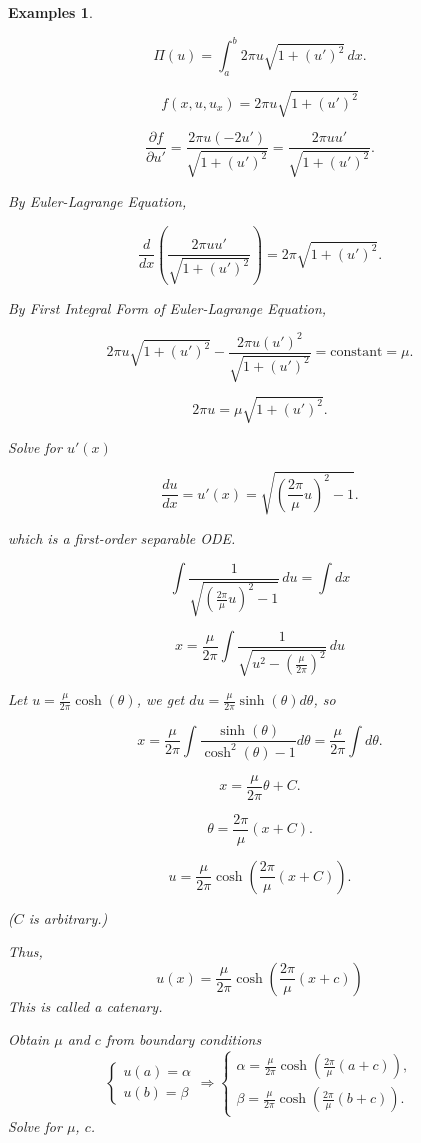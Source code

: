 \documentclass[12pt]{report}
\newtheorem{examples}{Examples}[section]
\begin{document}
\begin{examples}
\begin{enumerate}
\[
\Pi (u) = \int_a^b 2\pi u \sqrt{1+ (u')^2} \,dx.
\]

\[
f(x, u, u_x) = 2\pi u \sqrt{1+ (u')^2}
\]

\[
\frac{\partial f}{\partial  u'} = \frac{2\pi u (-2 u')}{\sqrt{1+(u')^2}} = \frac{2\pi u u'}{\sqrt{1+ (u')^2}}.
\]

By Euler-Lagrange Equation, 

\[
\frac{d}{dx} \left( \frac{2\pi u u'}{\sqrt{1+(u')^2}} \right) = 2\pi \sqrt{1+(u')^2}.
\]

By First Integral Form of Euler-Lagrange Equation, 

\[
2\pi u \sqrt{1+(u')^2} -\frac{ 2\pi u (u')^2}{\sqrt{1+(u')^2}} = \text{constant} = \mu.
\]

\[
2\pi u  = \mu \sqrt{1+(u')^2}.
\]

Solve for \( u'(x) \)

\[
\frac{du}{dx} = u'(x) = \sqrt{\left(\frac{2\pi}{\mu} u\right)^2 - 1}.
\]

which is a first-order separable ODE. 

\[
\int \frac{1}{\sqrt{\left(\frac{2\pi}{\mu} u\right)^2 - 1}} \,du = \int dx
\]

\[
x = \frac{\mu}{2\pi} \int \frac{1}{\sqrt{u^2 - \left(\frac{\mu}{2\pi}\right)^2}} \,du
\]

Let \( u = \frac{\mu}{2\pi} \cosh(\theta) \), we get \(
du = \frac{\mu}{2\pi} \sinh(\theta) d\theta
\), so 

\[
x = \frac{\mu}{2\pi} \int \frac{\sinh(\theta)}{\cosh^2(\theta) - 1} d\theta = \frac{\mu}{2\pi} \int d\theta.
\]

\[
x = \frac{\mu}{2\pi} \theta + C.
\]

\[
\theta = \frac{2\pi}{\mu} (x+C).
\]

\[
u = \frac{\mu}{2\pi} \cosh \left(\frac{2\pi}{\mu} (x+C)\right).
\]

(\( C \) is arbitrary.)

Thus,
\[ u(x) = \frac{\mu}{2\pi} \cosh\left(\frac{2\pi}{\mu} (x + c)\right) \]
This is called a catenary.

Obtain \( \mu \) and \( c \) from boundary conditions
\[
\begin{cases}
    u(a) = \alpha \\
    u(b) = \beta
\end{cases}
\Rightarrow
\begin{cases}
    \alpha = \frac{\mu}{2\pi} \cosh\left(\frac{2\pi}{\mu} (a + c)\right), \\
    \beta = \frac{\mu}{2\pi} \cosh\left(\frac{2\pi}{\mu} (b + c)\right).
\end{cases}
\]
Solve for \( \mu \), \( c \).


\end{enumerate}
\end{examples}
\end{document}
